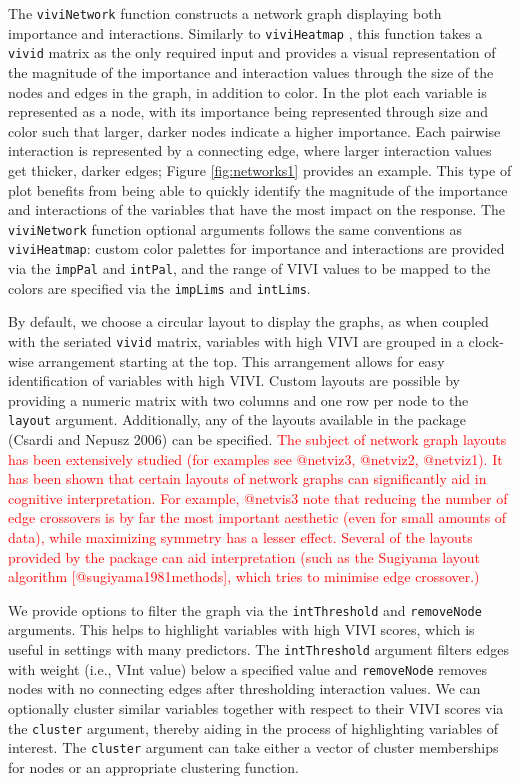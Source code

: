 The \texttt{viviNetwork} function constructs a network graph displaying both importance and interactions.
Similarly to \texttt{viviHeatmap} , this function takes a \texttt{vivid} matrix as the only required input and provides a visual representation of the magnitude of the importance and interaction values through the size of the nodes and edges in the graph, in addition to color. In the plot each variable is represented as a node, with its importance being represented through size and color such that larger, darker nodes indicate a higher importance. Each pairwise interaction is represented by a connecting edge, where larger interaction values get thicker, darker edges; Figure \ref{fig:networks1} provides an example. This type of plot benefits from being able to quickly identify the magnitude of the importance and interactions of the variables that have the most impact on the response. The \texttt{viviNetwork} function optional arguments follows the same conventions as \texttt{viviHeatmap}: custom color palettes for importance and interactions are provided via the \texttt{impPal} and \texttt{intPal}, and the range of VIVI values to be mapped to the colors are specified via the \texttt{impLims} and \texttt{intLims}.

By default, we choose a circular layout to display the graphs, as when coupled with the seriated \texttt{vivid} matrix, variables with high VIVI are grouped in a clock-wise arrangement starting at the top. This arrangement allows for easy identification of variables with high VIVI. Custom layouts are possible by providing a numeric matrix with two columns and one row per node to the \texttt{layout} argument. Additionally, any of the layouts available in the  package (Csardi and Nepusz 2006) can be specified. \textcolor{red}{The subject of network graph layouts has been extensively studied (for examples see @netviz3, @netviz2, @netviz1). It has been shown that certain layouts of network graphs can significantly aid in cognitive interpretation. For example, @netvis3 note that reducing the number of edge crossovers is by far the most important aesthetic (even for small amounts of data), while maximizing symmetry has a lesser effect. Several of the layouts provided by the  package can aid interpretation (such as the Sugiyama layout algorithm [@sugiyama1981methods], which tries to minimise edge crossover.)}

We provide options to filter the graph via the \texttt{intThreshold} and \texttt{removeNode} arguments. This helps to highlight variables with high VIVI scores, which is useful in settings with many predictors. The \texttt{intThreshold} argument filters edges with weight (i.e., VInt value) below a specified value and \texttt{removeNode} removes nodes with no connecting edges after thresholding interaction values. We can optionally cluster similar variables together with respect to their VIVI scores via the \texttt{cluster} argument, thereby aiding in the process of highlighting variables of interest. The \texttt{cluster} argument can take either a vector of cluster memberships for nodes or an appropriate  clustering function.

